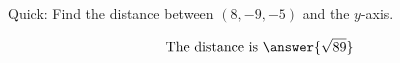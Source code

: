 \documentclass{ximera}
\author{Bart Snapp}
\begin{document}
\begin{exercise}
  Quick: Find the distance between $(8,-9,-5)$ and the $y$-axis.
  \begin{prompt}
  \[
  \text{The distance is }\answer{\sqrt{89}}
  \]
  \end{prompt}
\end{exercise}
\end{document}
